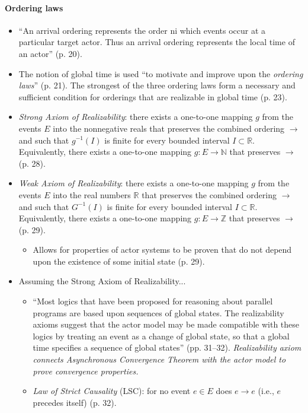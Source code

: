 \paragraph{Ordering laws}
\begin{itemize}
\item ``An arrival ordering represents the order ni which events occur at a particular target actor. Thus an arrival ordering represents the local time of an actor'' (p. 20).
\item The notion of global time is used ``to motivate and improve upon the \emph{ordering laws}'' \cite{Hewitt1977b} (p. 21). The strongest of the three ordering laws form a necessary and sufficient condition for orderings that are realizable in global time (p. 23).
\item \emph{Strong Axiom of Realizability}: there exists a one-to-one mapping $g$ from the events $E$ into the nonnegative reals that preserves the combined ordering $\rightarrow$ and such that $g^{-1}(I)$ is finite for every bounded interval $I \subset \mathbb{R}$. Equivalently, there exists a one-to-one mapping $g: E \rightarrow \mathbb{N}$ that preserves $\rightarrow$ (p. 28).
\item \emph{Weak Axiom of Realizability}: there exists a one-to-one mapping $g$ from the events $E$ into the real numbers $\mathbb{R}$ that preserves the combined ordering $\rightarrow$ and such that $G^{-1}(I)$ is finite for every bounded interval $I \subset \mathbb{R}$. Equivalently, there exists a one-to-one mapping $g: E \rightarrow \mathbb{Z}$ that preserves $\rightarrow$ (p. 29).
	\begin{itemize}
	\item Allows for properties of actor systems to be proven that do not depend upon the existence of some initial state (p. 29).
	\end{itemize}
\item Assuming the Strong Axiom of Realizability...
	\begin{itemize}
	\item ``Most logics that have been proposed for reasoning about parallel programs are based upon sequences of global states. The realizability axioms suggest that the actor model may be made compatible with these logics by treating an event as a change of global state, so that a global time specifies a sequence of global states'' (pp. 31--32). \emph{Realizability axiom connects Asynchronous Convergence Theorem with the actor model to prove convergence properties.}
	\item \emph{Law of Strict Causality} (LSC): for no event $e \in E$ does $e \rightarrow e$ (i.e., $e$ precedes itself) (p. 32).

\end{itemize}
\end{itemize}
